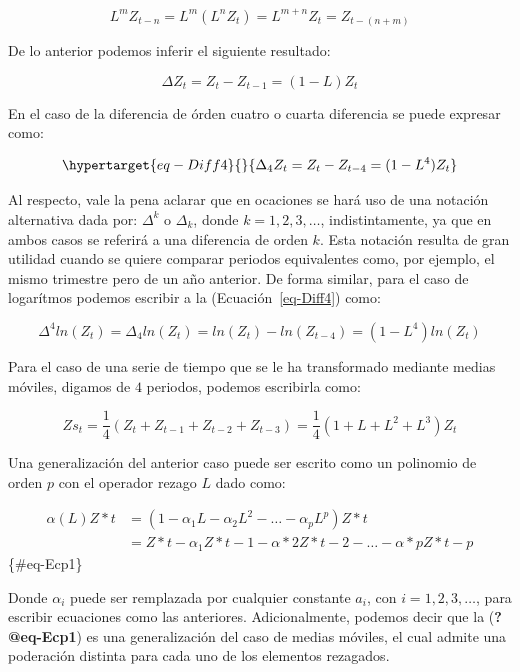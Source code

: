 \documentclass[
  a4paper,
]{article}
\begin{document}
\[
L^{m} Z_{t-n} = L^{m} (L^{n} Z_{t}) = L^{m + n} Z_{t} = Z_{t-(n + m)}
\]

De lo anterior podemos inferir el siguiente resultado:

\[
\Delta Z_{t} = Z_{t} - Z_{t-1} = (1 - L) Z_{t}
\]

En el caso de la diferencia de órden cuatro o cuarta diferencia se puede
expresar como:

\begin{equation}\protect\hypertarget{eq-Diff4}{}{
\Delta_{4} Z_{t} = Z_{t} - Z_{t-4} = (1 - L^4) Z_{t}
}\label{eq-Diff4}\end{equation}

Al respecto, vale la pena aclarar que en ocaciones se hará uso de una
notación alternativa dada por: \(\Delta^k\) o \(\Delta_k\), donde
\(k = 1, 2, 3, \ldots\), indistintamente, ya que en ambos casos se
referirá a una diferencia de orden \(k\). Esta notación resulta de gran
utilidad cuando se quiere comparar periodos equivalentes como, por
ejemplo, el mismo trimestre pero de un año anterior. De forma similar,
para el caso de logarítmos podemos escribir a la
(Ecuación~\ref{eq-Diff4}) como:

\[
\Delta^{4} ln(Z_{t}) = \Delta_{4} ln(Z_{t}) = ln(Z_{t}) - ln(Z_{t-4}) = (1 - L^4) ln(Z_{t})
\]

Para el caso de una serie de tiempo que se le ha transformado mediante
medias móviles, digamos de \(4\) periodos, podemos escribirla como:

\[
Zs_{t} = \frac{1}{4}(Z_{t} + Z_{t-1} + Z_{t-2} + Z_{t-3}) = \frac{1}{4}(1 + L + L^2 + L^3)Z_{t}
\]

Una generalización del anterior caso puede ser escrito como un polinomio
de orden \(p\) con el operador rezago \(L\) dado como:

\begin{align}
\alpha(L) Z*{t} & = (1 - \alpha_1 L - \alpha_2 L^2 - \ldots - \alpha_p L^p) Z*{t} \nonumber \\
& = Z*{t} - \alpha_1 Z*{t-1} - \alpha*2 Z*{t-2} - \ldots - \alpha*p Z*{t-p}
\end{align} \{\#eq-Ecp1\}

Donde \(\alpha_i\) puede ser remplazada por cualquier constante \(a_i\),
con \(i = 1, 2, 3, \ldots\), para escribir ecuaciones como las
anteriores. Adicionalmente, podemos decir que la (\textbf{?@eq-Ecp1}) es
una generalización del caso de medias móviles, el cual admite una
poderación distinta para cada uno de los elementos rezagados.
\end{document}
